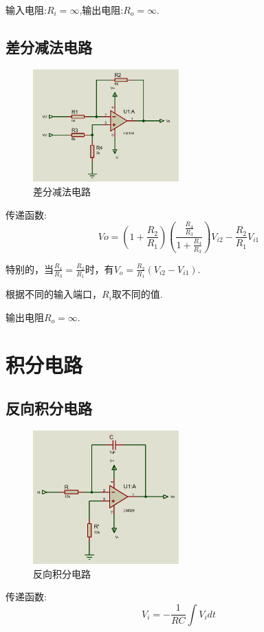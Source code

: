 \documentclass[a4paper,11pt,UTF8]{article}
\begin{document}
输入电阻:$R_i=\infty$,输出电阻:$R_o = \infty$.

\subsection{差分减法电路}
\begin{figure}[H]
	\centering
	\includegraphics[width=0.5\textwidth]{差分减法电路}
	\caption{差分减法电路}
\end{figure}
传递函数:
$$Vo = (1+\frac{R_2}{R_1})(\frac{\frac{R_4}{R_3}}{1+\frac{R_4}{R_3}})V_{i2}-\frac{R_2}{R_1}V_{i1}$$

特别的，当$\frac{R_4}{R_3}=\frac{R_2}{R_1}$时，有$V_o=\frac{R_2}{R_1}(V_{i2}-V_{i1})$.

根据不同的输入端口，$R_i$取不同的值.

输出电阻$R_o=\infty$.

\section{积分电路}
\subsection{反向积分电路}

\begin{figure}[H]
	\centering
	\includegraphics[width=0.5\textwidth]{反向积分电路}
	\caption{反向积分电路}
\end{figure}
传递函数:
$$V_i = -\frac{1}{RC}\int V_i dt$$
\end{document}
